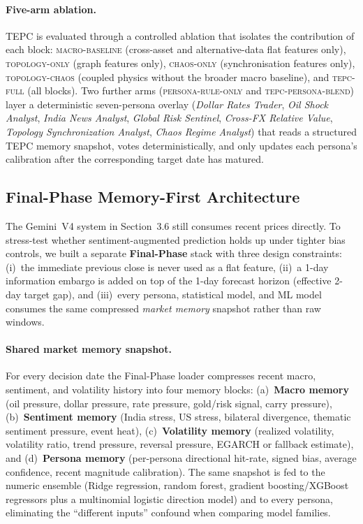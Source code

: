 \documentclass[11pt]{article}
\begin{document}
\paragraph{Five-arm ablation.}
TEPC is evaluated through a controlled ablation that isolates the contribution of each block: \textsc{macro-baseline} (cross-asset and alternative-data flat features only), \textsc{topology-only} (graph features only), \textsc{chaos-only} (synchronisation features only), \textsc{topology-chaos} (coupled physics without the broader macro baseline), and \textsc{tepc-full} (all blocks). Two further arms (\textsc{persona-rule-only} and \textsc{tepc-persona-blend}) layer a deterministic seven-persona overlay (\textit{Dollar Rates Trader}, \textit{Oil Shock Analyst}, \textit{India News Analyst}, \textit{Global Risk Sentinel}, \textit{Cross-FX Relative Value}, \textit{Topology Synchronization Analyst}, \textit{Chaos Regime Analyst}) that reads a structured TEPC memory snapshot, votes deterministically, and only updates each persona's calibration after the corresponding target date has matured.

\subsection{Final-Phase Memory-First Architecture}
\label{sec:finalphase}

The Gemini~V4 system in Section~3.6 still consumes recent prices directly. To stress-test whether sentiment-augmented prediction holds up under tighter bias controls, we built a separate \textbf{Final-Phase} stack with three design constraints: (i)~the immediate previous close is never used as a flat feature, (ii)~a 1-day information embargo is added on top of the 1-day forecast horizon (effective 2-day target gap), and (iii)~every persona, statistical model, and ML model consumes the same compressed \emph{market memory} snapshot rather than raw windows.

\paragraph{Shared market memory snapshot.}
For every decision date the Final-Phase loader compresses recent macro, sentiment, and volatility history into four memory blocks: (a)~\textbf{Macro memory} (oil pressure, dollar pressure, rate pressure, gold/risk signal, carry pressure), (b)~\textbf{Sentiment memory} (India stress, US stress, bilateral divergence, thematic sentiment pressure, event heat), (c)~\textbf{Volatility memory} (realized volatility, volatility ratio, trend pressure, reversal pressure, EGARCH or fallback estimate), and (d)~\textbf{Persona memory} (per-persona directional hit-rate, signed bias, average confidence, recent magnitude calibration). The same snapshot is fed to the numeric ensemble (Ridge regression, random forest, gradient boosting/XGBoost regressors plus a multinomial logistic direction model) and to every persona, eliminating the ``different inputs'' confound when comparing model families.
\end{document}

